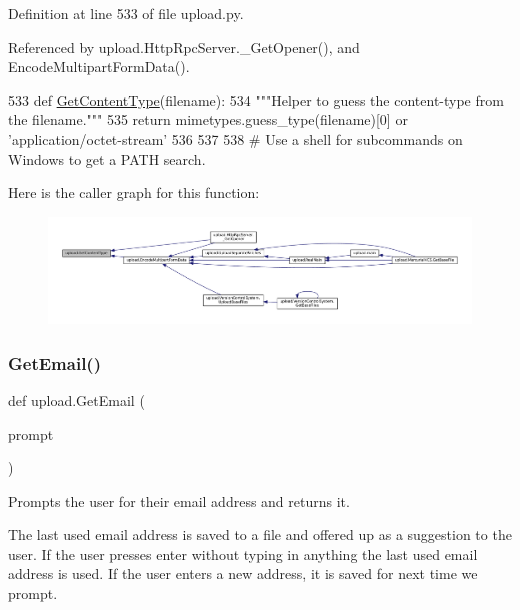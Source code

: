 Definition at line 533 of file upload.\+py.



Referenced by upload.\+Http\+Rpc\+Server.\+\_\+\+Get\+Opener(), and Encode\+Multipart\+Form\+Data().


\begin{DoxyCode}
533 \textcolor{keyword}{def }\hyperlink{namespaceupload_a753a004706d964335ad218628e07b063}{GetContentType}(filename):
534   \textcolor{stringliteral}{"""Helper to guess the content-type from the filename."""}
535   \textcolor{keywordflow}{return} mimetypes.guess\_type(filename)[0] \textcolor{keywordflow}{or} \textcolor{stringliteral}{'application/octet-stream'}
536 
537 
538 \textcolor{comment}{# Use a shell for subcommands on Windows to get a PATH search.}
\end{DoxyCode}
Here is the caller graph for this function\+:
\nopagebreak
\begin{figure}[H]
\begin{center}
\leavevmode
\includegraphics[width=350pt]{namespaceupload_a753a004706d964335ad218628e07b063_icgraph}
\end{center}
\end{figure}
\mbox{\label{namespaceupload_a4f169469a6d43221ebd38cfd546484e1}} 
\subsubsection{\texorpdfstring{Get\+Email()}{GetEmail()}}
{\footnotesize\ttfamily def upload.\+Get\+Email (\begin{DoxyParamCaption}\item[{}]{prompt }\end{DoxyParamCaption})}

\begin{DoxyVerb}Prompts the user for their email address and returns it.

The last used email address is saved to a file and offered up as a suggestion
to the user. If the user presses enter without typing in anything the last
used email address is used. If the user enters a new address, it is saved
for next time we prompt.\end{DoxyVerb}
 

